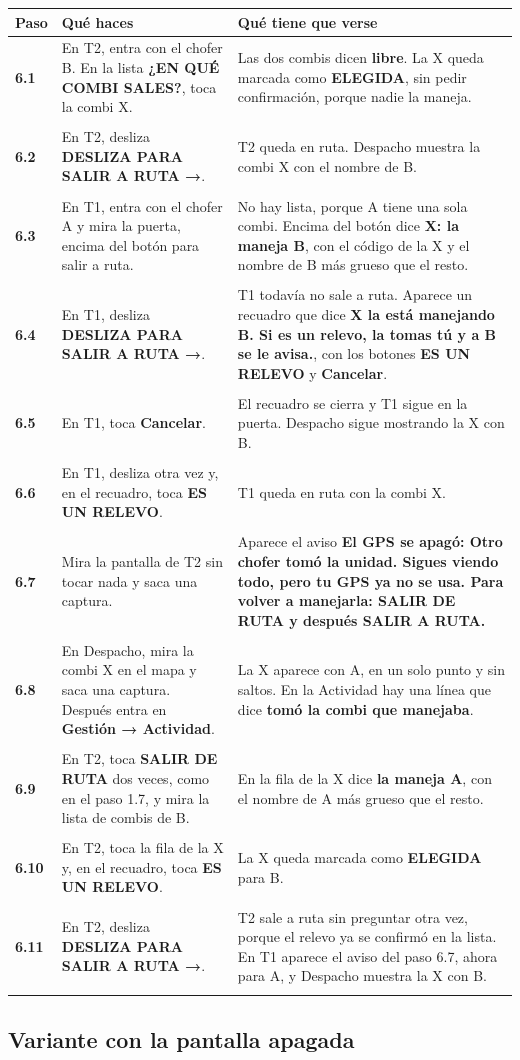 \documentclass[10pt,a4paper]{article}
\makeatletter
\newcommand{\toca}[1]{\textcolor{azul}{\textbf{#1}}}
\newcommand{\pantalla}[1]{\textcolor{marron}{\textbf{#1}}}
\newcommand{\caja}[2]{\hbox{\vrule height #1 depth 0pt width 0pt #2}}
\newcommand{\campo}[3]{%
  \raisebox{-0.35\height}{\caja{#3}{\TextField[name=#1, width=#2, height=#3, charsize=8pt, bordercolor={0.55 0.6 0.68},
    backgroundcolor={0.965 0.976 0.992}, multiline=true]{}}}}
\newcommand{\resultado}[1]{%
  \caja{9pt}{\ChoiceMenu[radio, name=resultado-#1, width=9pt, height=9pt, radiosymbol=l,
    bordercolor={0.35 0.38 0.45}, default=]{}{OK=ok,FALLA=falla,NO SE PUDO=nopudo}}}
\newcommand{\paso}[4]{%
  \textbf{#1} & #3 & #4 \\*
  \multicolumn{3}{@{\hspace{6pt}}l@{}}{\rule{0pt}{15pt}\small
    \resultado{#2}\hspace{0.4em}Hora:~\campo{hora-#2}{1.7cm}{13pt}\hspace{1.2em}Nota:~\campo{nota-#2}{8.3cm}{22pt}}\\[3pt]
  \hline
}
\newenvironment{pasos}{%
  \begin{longtable}{@{\hspace{6pt}}>{\raggedright\arraybackslash}p{0.9cm}>{\raggedright\arraybackslash}p{7.9cm}>{\raggedright\arraybackslash}p{7.3cm}@{}}
  \rowcolor{cabecera}\textbf{Paso} & \textbf{Qué haces} & \textbf{Qué tiene que verse} \\ \hline
  \endhead
}{\end{longtable}\vspace{-0.6em}}
\makeatother
\begin{document}
\begin{Form}
\begin{pasos}
\paso{6.1}{6-1}{En T2, entra con el chofer B. En la lista \pantalla{¿EN QUÉ COMBI SALES?}, toca la combi X.}{Las dos combis dicen \pantalla{libre}. La X queda marcada como \pantalla{ELEGIDA}, sin pedir confirmación, porque nadie la maneja.}
\paso{6.2}{6-2}{En T2, desliza \toca{DESLIZA PARA SALIR A RUTA →}.}{T2 queda en ruta. Despacho muestra la combi X con el nombre de B.}
\paso{6.3}{6-3}{En T1, entra con el chofer A y mira la puerta, encima del botón para salir a ruta.}{No hay lista, porque A tiene una sola combi. Encima del botón dice \pantalla{X: la maneja B}, con el código de la X y el nombre de B más grueso que el resto.}
\paso{6.4}{6-4}{En T1, desliza \toca{DESLIZA PARA SALIR A RUTA →}.}{T1 todavía no sale a ruta. Aparece un recuadro que dice \pantalla{X la está manejando B. Si es un relevo, la tomas tú y a B se le avisa.}, con los botones \pantalla{ES UN RELEVO} y \pantalla{Cancelar}.}
\paso{6.5}{6-5}{En T1, toca \toca{Cancelar}.}{El recuadro se cierra y T1 sigue en la puerta. Despacho sigue mostrando la X con B.}
\paso{6.6}{6-6}{En T1, desliza otra vez y, en el recuadro, toca \toca{ES UN RELEVO}.}{T1 queda en ruta con la combi X.}
\paso{6.7}{6-7}{Mira la pantalla de T2 sin tocar nada y saca una captura.}{Aparece el aviso \pantalla{El GPS se apagó: Otro chofer tomó la unidad. Sigues viendo todo, pero tu GPS ya no se usa. Para volver a manejarla: SALIR DE RUTA y después SALIR A RUTA.}}
\paso{6.8}{6-8}{En Despacho, mira la combi X en el mapa y saca una captura. Después entra en \toca{Gestión → Actividad}.}{La X aparece con A, en un solo punto y sin saltos. En la Actividad hay una línea que dice \pantalla{tomó la combi que manejaba}.}
\paso{6.9}{6-9}{En T2, toca \toca{SALIR DE RUTA} dos veces, como en el paso 1.7, y mira la lista de combis de B.}{En la fila de la X dice \pantalla{la maneja A}, con el nombre de A más grueso que el resto.}
\paso{6.10}{6-10}{En T2, toca la fila de la X y, en el recuadro, toca \toca{ES UN RELEVO}.}{La X queda marcada como \pantalla{ELEGIDA} para B.}
\paso{6.11}{6-11}{En T2, desliza \toca{DESLIZA PARA SALIR A RUTA →}.}{T2 sale a ruta sin preguntar otra vez, porque el relevo ya se confirmó en la lista. En T1 aparece el aviso del paso 6.7, ahora para A, y Despacho muestra la X con B.}
\end{pasos}

\subsection{Variante con la pantalla apagada}


\end{Form}
\end{document}
